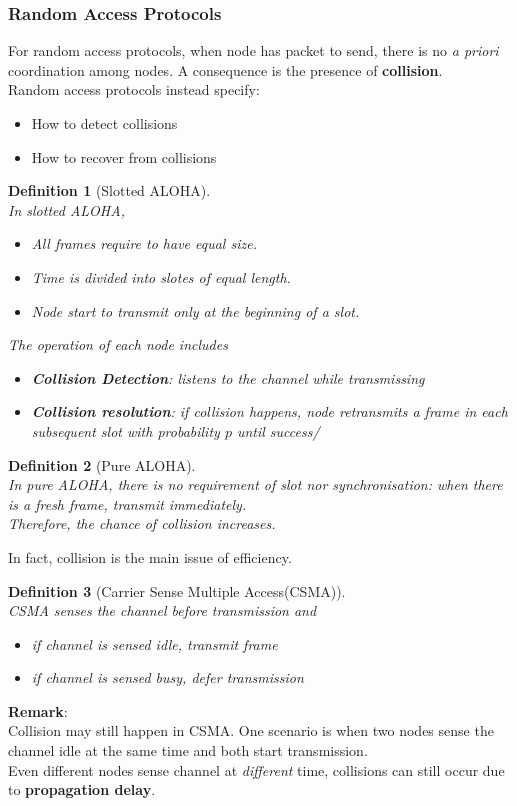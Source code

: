 \documentclass[12pt]{article}
\newtheorem{definition}{Definition}[section]
\theoremstyle{definition}
\begin{document}
\subsubsection{Random Access Protocols}
For random access protocols, when node has packet to send, there is no \textit{a priori} coordination among nodes. A consequence is the presence of \textbf{collision}.\\Random access protocols instead specify:
\begin{itemize}
  \item How to detect collisions
  \item How to recover from collisions
\end{itemize}
\begin{definition}[Slotted ALOHA]
\hfill\\\normalfont In slotted ALOHA,
\begin{itemize}
  \item All frames require to have equal size.
  \item Time is divided into slotes of equal length.
  \item Node start to transmit only at the beginning of a slot.
\end{itemize}
The operation of each node includes
\begin{itemize}
\item \textbf{Collision Detection}: listens to the channel while transmissing
\item \textbf{Collision resolution}: if collision happens, node retransmits a frame in \textit{each subsequent} slot with probability $p$ until success/
\end{itemize}
\end{definition}
\begin{definition}[Pure ALOHA]
\hfill\\\normalfont In pure ALOHA, there is no requirement of slot nor synchronisation: when there is a fresh frame, transmit immediately.\\Therefore, the chance of collision increases.
\end{definition}
In fact, collision is the main issue of efficiency. 
\begin{definition}[Carrier Sense Multiple Access(CSMA)]
\hfill\\\normalfont CSMA senses the channel before transmission and 
\begin{itemize}
  \item if channel is \textit{sensed idle}, transmit frame
  \item if channel is \textit{sensed  busy}, defer transmission
\end{itemize}
\end{definition}
\textbf{Remark}:\\ Collision may still happen in CSMA. One scenario is when two nodes sense the channel idle at the same time and both start transmission.\\
Even different nodes sense channel at \textit{different} time, collisions can still occur due to \textbf{propagation delay}.
\end{document}
